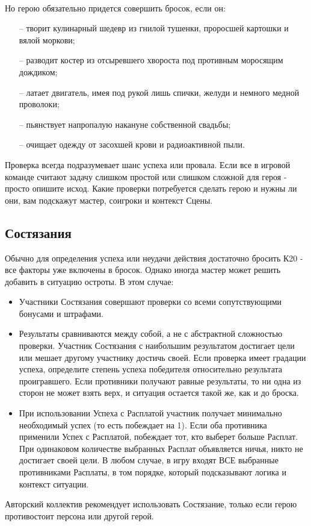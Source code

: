 \paragraph{}Но герою обязательно придется совершить бросок, если он:
\begin{itemize}
\item[--]творит кулинарный шедевр из гнилой тушенки, проросшей картошки и вялой моркови;
\item[--]разводит костер из отсыревшего хвороста под противным моросящим дождиком;
\item[--]латает двигатель, имея под рукой лишь спички, желуди и немного медной проволоки;
\item[--]пьянствует напропалую накануне собственной свадьбы;
\item[--]очищает одежду от засохшей крови и радиоактивной пыли.
\end{itemize}
\begin{tcolorbox}
Проверка всегда подразумевает шанс успеха или провала. Если все в игровой команде считают задачу слишком простой или слишком сложной для героя - просто опишите исход.
\newline Какие проверки потребуется сделать герою и нужны ли они, вам подскажут мастер, соигроки и контекст Сцены.
\end{tcolorbox}

\subsection{Состязания}
Обычно для определения успеха или неудачи действия достаточно бросить К20 - все факторы уже включены в бросок. Однако иногда мастер может решить добавить в ситуацию остроты. В этом случае:
\begin{itemize}
    \item Участники Состязания совершают проверки со всеми сопутствующими бонусами и штрафами. 
    \item Результаты сравниваются между собой, а не с абстрактной сложностью проверки. Участник Состязания с наибольшим результатом достигает цели или мешает другому участнику достичь своей. 
    \newline Если проверка имеет градации успеха, определите степень успеха победителя относительно результата проигравшего. Если противники получают равные результаты, то ни одна из сторон не может взять верх, и ситуация остается такой же, как и до броска. 
    \item При использовании Успеха с Расплатой участник получает минимально необходимый успех (то есть побеждает на 1). Если оба противника применили Успех с Расплатой, побеждает тот, кто выберет больше Расплат. При одинаковом количестве выбранных Расплат объявляется ничья, никто не достигает своей цели. В любом случае, в игру входят ВСЕ выбранные противниками Расплаты, в том порядке, который подсказывают логика и контекст ситуации. 
\end{itemize}
\begin{tcolorbox}
Авторский коллектив рекомендует использовать Состязание, только если герою противостоит персона или другой герой.
\end{tcolorbox}

